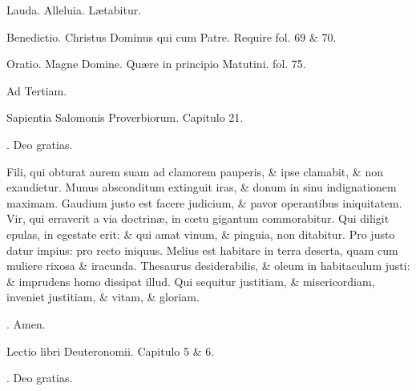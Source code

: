 \documentclass[letter,11pt]{book}
\makeatletter
\DeclareRobustCommand{\Rbar}{\vers@resp{0pt}{R}}
\newcommand{\vers@resp@sym}{\raisebox{0.2ex}{\rotatebox[origin=c]{-20}{$\m@th\rceil$}}}
\newcommand{\vers@resp}[2]{%
  {\ooalign{\hidewidth\kern#1\vers@resp@sym\hidewidth\cr#2\cr}}%
}%
\def\R{\color{Red} \Rbar . \color{black}}
\makeatother
\begin{document}
\begin{multicols*}{2}
Lauda. Alleluia. L\ae tabitur.

Benedictio. Christus Dominus qui cum Patre. Require fol. 69 \& 70.

Oratio. Magne Domine. Qu\ae re in principio Matutini. fol. 75.

Ad Tertiam.

Sapientia Salomonis Proverbiorum. Capitulo 21.

\R Deo gratias.

Fili, qui obturat aurem suam ad clamorem pauperis, \& ipse clamabit, \& non exaudietur. Munus absconditum extinguit iras, \& donum in sinu indignationem maximam. Gaudium justo est facere judicium, \& pavor operantibus iniquitatem. Vir, qui erraverit a via doctrin\ae , in c\oe tu gigantum commorabitur. Qui diligit epulas, in egestate erit: \& qui amat vinum, \& pinguia, non ditabitur. Pro justo datur impius: pro recto iniquus. Melius est habitare in terra deserta, quam cum muliere rixosa \& iracunda. Thesaurus desiderabilis, \& oleum in habitaculum justi: \& imprudens homo dissipat illud. Qui sequitur justitiam, \& misericordiam, inveniet justitiam, \& vitam, \& gloriam.

\R Amen.

Lectio libri Deuteronomii. Capitulo 5 \& 6.

\R Deo gratias.


\end{multicols*}
\end{document}

